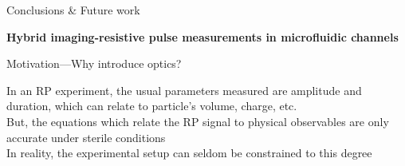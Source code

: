 \begin{frame}[c]{Conclusions \& Future work}

      

\end{frame}





\begin{frame}[c]{}
	\begin{center}
		\textbf{Hybrid imaging-resistive pulse measurements in microfluidic channels}
	\end{center}
\end{frame}





\begin{frame}[c]{Motivation---Why introduce optics?}
	
	In an RP experiment, the usual parameters measured are amplitude and duration, which can relate to particle's volume, charge, etc. \\
	\vspace{.3in}
	But, the equations which relate the RP signal to physical observables are only accurate under sterile conditions \\
	\vspace{.3in}
 	In reality, the experimental setup can seldom be constrained to this degree \\
 	

\end{frame}



